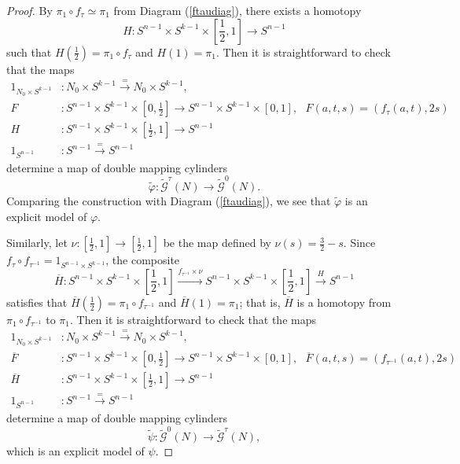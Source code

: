 \documentclass[a4]{amsart}
\theoremstyle{definition}
\begin{document}
\begin{sloppypar}
\begin{proof}
By $\pi_1\circ f_\tau\simeq \pi_1$ from Diagram (\ref{ftaudiag}), there exists a homotopy
\[
H: S^{n-1}\times S^{k-1}\times [\frac{1}{2}, 1] \stackrel{}{\longrightarrow} S^{n-1}
\]
such that $H(\frac{1}{2})=\pi_1\circ f_\tau$ and $H(1)=\pi_1$. Then it is straightforward to check that the maps
\[
\begin{split}
1_{N_0\times S^{k-1}}& :N_0\times S^{k-1}\stackrel{=}{\longrightarrow} N_0\times S^{k-1},   \\
F  & :      S^{n-1}\times S^{k-1}\times [0, \frac{1}{2}]\longrightarrow  S^{n-1}\times S^{k-1}\times [0, 1],  \ \ \    F(a, t, s)= (f_\tau(a, t), 2s)%
      \\ 
H& :S^{n-1}\times S^{k-1}\times [\frac{1}{2}, 1] \stackrel{}{\longrightarrow} S^{n-1} \\ 
1_{S^{n-1}}& :S^{n-1} \stackrel{=}{\longrightarrow} S^{n-1}
\end{split}
\]
determine a map of double mapping cylinders 
\[
\widetilde{\varphi}: \widetilde{\mathcal{G}}^\tau(N)
\stackrel{}{\longrightarrow} \widetilde{\mathcal{G}}^0(N).
\]
Comparing the construction with Diagram (\ref{ftaudiag}), we see that $\widetilde{\varphi}$ is an explicit model of $\varphi$. 

Similarly, let $\nu: [\frac{1}{2}, 1]\stackrel{}{\longrightarrow}[\frac{1}{2}, 1]$ be the map defined by $\nu(s)=\frac{3}{2}-s$. Since $f_{\tau}\circ f_{\tau^{-1}}=1_{S^{n-1}\times S^{k-1}}$, the composite 
\[
\overline{H}: S^{n-1}\times S^{k-1}\times [\frac{1}{2}, 1] \stackrel{f_{\tau^{-1}}\times \nu}{\longrightarrow}S^{n-1}\times S^{k-1}\times [\frac{1}{2}, 1] \stackrel{H}{\longrightarrow} S^{n-1}
\]
satisfies that $\overline{H}(\frac{1}{2})=\pi_1\circ f_{\tau^{-1}}$ and $\overline{H}(1)= \pi_1$; that is, $\overline{H}$ is a homotopy from $\pi_1\circ f_{\tau^{-1}}$ to $\pi_1$. 
Then it is straightforward to check that the maps
\[
\begin{split}
1_{N_0\times S^{k-1}}& :N_0\times S^{k-1}\stackrel{=}{\longrightarrow} N_0\times S^{k-1},   \\
\overline{F}    & :       S^{n-1}\times S^{k-1}\times [0, \frac{1}{2}]\longrightarrow  S^{n-1}\times S^{k-1}\times [0, 1],  \ \ \    \overline{F}(a, t, s)= (f_{\tau^{-1}}(a, t), 2s)%
\\ 
\overline{H}& :S^{n-1}\times S^{k-1}\times [\frac{1}{2}, 1] \stackrel{}{\longrightarrow} S^{n-1} \\ 
1_{S^{n-1}}& :S^{n-1} \stackrel{=}{\longrightarrow} S^{n-1}
\end{split}
\]
determine a map of double mapping cylinders 
\[
\widetilde{\psi}: \widetilde{\mathcal{G}}^0(N)
\stackrel{}{\longrightarrow} \widetilde{\mathcal{G}}^\tau (N),
\]
which is an explicit model of $\psi$. 


\end{proof}
\end{sloppypar}
\end{document}
